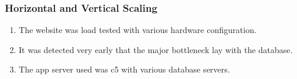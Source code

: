 \begin{frame}
\frametitle{Horizontal and Vertical Scaling}
\begin{enumerate}[<+->]
	\setlength\itemsep{1em}
	\item The website was load tested with various hardware configuration.
	\item It was detected very early that the major bottleneck lay with the database.
	\item The app server used was c5 with various database servers.
\end{enumerate}
\end{frame}



